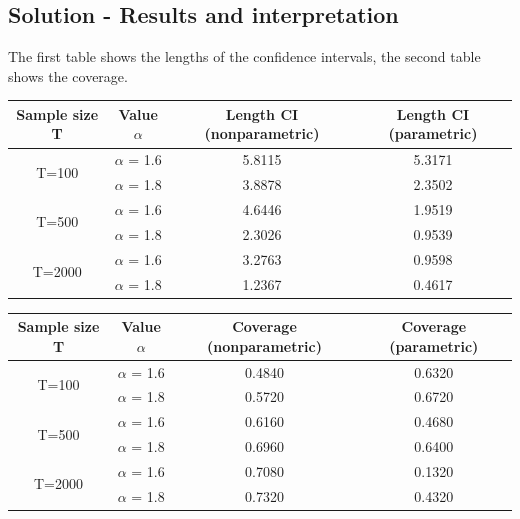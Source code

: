 \documentclass[12pt]{article}
\begin{document}
\newpage
\subsection*{Solution - Results and interpretation}
The first table shows the lengths of the confidence intervals, the second table shows the coverage.  

\begin{center}
\begin{tabular}{||c | c | c c||} 
 \hline
 Sample size T & Value $\alpha$ & Length CI (nonparametric) & Length CI (parametric) \\ [0.5ex] 
 \hline\hline
 \multirow{2}{4em}{T=100} & $\alpha$ = 1.6 & 5.8115 & 5.3171\\ 
& $\alpha$ = 1.8 & 3.8878 & 2.3502 \\ 

 \hline
 \multirow{2}{4em}{T=500} & $\alpha$ = 1.6 & 4.6446 & 1.9519\\ 
& $\alpha$ = 1.8 & 2.3026 & 0.9539 \\ 

 \hline
 \multirow{2}{4em}{T=2000} & $\alpha$ = 1.6 & 3.2763 & 0.9598\\ 
& $\alpha$ = 1.8 & 1.2367 & 0.4617 \\ 
 
 \hline
\end{tabular}
\end{center}

\begin{center}
\begin{tabular}{||c | c | c c||} 
 \hline
 Sample size T & Value $\alpha$ & Coverage (nonparametric) & Coverage (parametric) \\ [0.5ex] 
 \hline\hline
 \multirow{2}{4em}{T=100} & $\alpha$ = 1.6 & 0.4840 & 0.6320\\ 
& $\alpha$ = 1.8 & 0.5720 & 0.6720 \\ 

 \hline
 \multirow{2}{4em}{T=500} & $\alpha$ = 1.6 & 0.6160 & 0.4680\\ 
& $\alpha$ = 1.8 & 0.6960 & 0.6400 \\ 

 \hline
 \multirow{2}{4em}{T=2000} & $\alpha$ = 1.6 & 0.7080 & 0.1320\\ 
& $\alpha$ = 1.8 & 0.7320 & 0.4320 \\ 
 
 \hline
\end{tabular}
\end{center}
\end{document}
